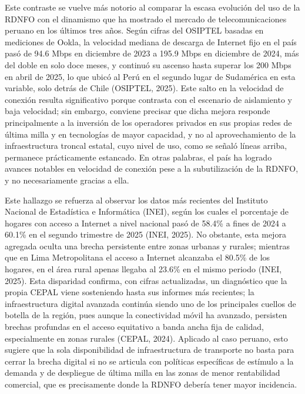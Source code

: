 Este contraste se vuelve más notorio al comparar la escasa evolución del uso de la RDNFO con el dinamismo que ha mostrado el mercado de telecomunicaciones peruano en los últimos tres años. Según cifras del OSIPTEL basadas en mediciones de Ookla, la velocidad mediana de descarga de Internet fijo en el país pasó de 94.6 Mbps en diciembre de 2023 a 195.9 Mbps en diciembre de 2024, más del doble en solo doce meses, y continuó su ascenso hasta superar los 200 Mbps en abril de 2025, lo que ubicó al Perú en el segundo lugar de Sudamérica en esta variable, solo detrás de Chile (OSIPTEL, 2025). Este salto en la velocidad de conexión resulta significativo porque contrasta con el escenario de aislamiento y baja velocidad; sin embargo, conviene precisar que dicha mejora responde principalmente a la inversión de los operadores privados en sus propias redes de última milla y en tecnologías de mayor capacidad, y no al aprovechamiento de la infraestructura troncal estatal, cuyo nivel de uso, como se señaló líneas arriba, permanece prácticamente estancado. En otras palabras, el país ha logrado avances notables en velocidad de conexión pese a la subutilización de la RDNFO, y no necesariamente gracias a ella.

Este hallazgo se refuerza al observar los datos más recientes del Instituto Nacional de Estadística e Informática (INEI), según los cuales el porcentaje de hogares con acceso a Internet a nivel nacional pasó de 58.4\% a fines de 2024 a 60.1\% en el segundo trimestre de 2025 (INEI, 2025). No obstante, esta mejora agregada oculta una brecha persistente entre zonas urbanas y rurales; mientras que en Lima Metropolitana el acceso a Internet alcanzaba el 80.5\% de los hogares, en el área rural apenas llegaba al 23.6\% en el mismo periodo (INEI, 2025). Esta disparidad confirma, con cifras actualizadas, un diagnóstico que la propia CEPAL viene sosteniendo hasta sus informes más recientes; la infraestructura digital avanzada continúa siendo uno de los principales cuellos de botella de la región, pues aunque la conectividad móvil ha avanzado, persisten brechas profundas en el acceso equitativo a banda ancha fija de calidad, especialmente en zonas rurales (CEPAL, 2024). Aplicado al caso peruano, esto sugiere que la sola disponibilidad de infraestructura de transporte no basta para cerrar la brecha digital si no se articula con políticas específicas de estímulo a la demanda y de despliegue de última milla en las zonas de menor rentabilidad comercial, que es precisamente donde la RDNFO debería tener mayor incidencia.

